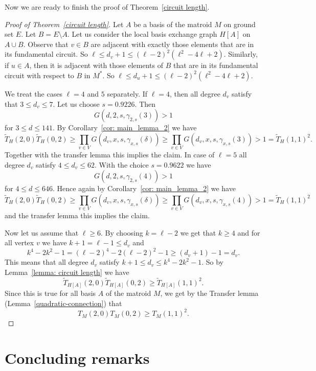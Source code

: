 \documentclass[12pt,a4paper]{amsart}
\numberwithin{equation}{section}
\theoremstyle{plain}
\theoremstyle{definition}
\newcommand{\1}{\textbf{1}}
\newcommand{\wT}{\widetilde{T}}
\begin{document}
Now we are ready to finish the proof of Theorem~\ref{circuit length}.

\begin{proof}[Proof of Theorem~\ref{circuit length}] Let $A$ be a basis of the matroid $M$ on ground set $E$. Let $B=E\setminus A$. Let us consider the local basis exchange graph $H[A]$ on $A\cup B$. Observe that $v\in B$ are adjacent with exactly those elements that are in its fundamental circuit. So $\ell\leqslant   d_v+1\leqslant   (\ell-2)^2(\ell^2-4\ell+2)$. Similarly, if $u\in A$, then it is adjacent with those elements of $B$ that are in its fundamental circuit with respect to $B$ in $M^*$. So $\ell\leqslant   d_u+1\leqslant  (\ell-2)^2(\ell^2-4\ell+2)$.

We treat the cases $\ell=4$ and $5$ separately. If $\ell=4$, then all degree $d_v$ satisfy that $3\leqslant   d_v\leqslant   7$. Let us choose $s=0.9226$. Then 
$$G(d,2,s,\gamma_{2,s}(3))>1$$
for $3\leqslant   d\leqslant   141$. By Corollary~\ref{cor: main_lemma_2} we have
$$\wT_H(2,0)\wT_H(0,2)\geqslant\prod_{v\in V}G(d_v,x,s,\gamma_{x,s}(\delta))\geqslant\prod_{v\in V}G(d_v,x,s,\gamma_{x,s}(3))>1=\wT_H(1,1)^2.$$
Together with the transfer lemma this implies the claim. In case of $\ell=5$ all degree $d_v$ satisfy $4\leqslant   d_v \leqslant   62$. With the choice $s=0.9622$ we have  
$$G(d,2,s,\gamma_{2,s}(4))>1$$
for $4\leqslant   d\leqslant   646$. Hence again by Corollary~\ref{cor: main_lemma_2} we have
$$\wT_H(2,0)\wT_H(0,2)\geqslant\prod_{v\in V}G(d_v,x,s,\gamma_{x,s}(\delta))\geqslant\prod_{v\in V}G(d_v,x,s,\gamma_{x,s}(4))>1=\wT_H(1,1)^2$$
and the transfer lemma this implies the claim.

Now let us assume that $\ell \geqslant 6$. By choosing $k=\ell-2$ we get that $k\geq 4$ and for all vertex $v$ we have $k+1=\ell-1\leq d_v$ and
$$k^4-2k^2-1=(\ell-2)^4-2(\ell-2)^2-1 \geqslant (d_v+1)-1=d_v.$$
 This means that all degree $d_v$ satisfy $k+1\leqslant   d_v\leqslant   k^4-2k^2-1$. So by Lemma~\ref{lemma: circuit length} we have 
$$\wT_{H[A]}(2,0)\wT_{H[A]}(0,2)\geqslant\wT_{H[A]}(1,1)^2.$$
Since this is true for all basis $A$ of the matroid $M$, we get by the Transfer lemma (Lemma~\ref{quadratic-connection}) that
$$T_M(2,0)T_M(0,2)\geqslant T_M(1,1)^2.$$



\end{proof}

\section{Concluding remarks}
\label{sect: concluding_remarks}
\end{document}
